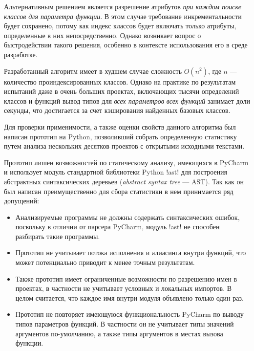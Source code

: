 Альтернативным решением является разрешение атрибутов \emph{при каждом поиске
 классов для параметра функции}. В этом случае требование инкрементальности
будет сохранено, потому как индекс классов будет включать только атрибуты,
определенные в них непосредственно. Однако возникает вопрос о быстродействии
такого решения, особенно в контексте использования его в среде разработке. 

Разработанный алгоритм имеет в худшем случае сложность $O(n^2)$, где $n$ ---
количество проиндексированных классов. Однако на практике по результатам испытаний даже в
очень больших проектах, включающих тысячи определений классов и функций вывод
типов для \emph{всех параметров всех функций} занимает доли секунды, что
достигается за счет кэширования найденных базовых классов.


Для проверки применимости, а также оценки свойств данного алгоритма был написан
прототип на Python, позволивший собрать определенную статистику путем анализа
нескольких десятков проектов с открытыми исходными текстами.

Прототип лишен возможностей по статическому анализу, имеющихся в PyCharm и
использует модуль стандартной библиотеки Python !ast! для построения абстрактных
синтаксических деревьев (\emph{abstract syntax tree} --- AST). Так как он был
написан преимущественно для сбора статистики в нем принимается ряд допущений:


\begin{itemize}
    \item{%
        Анализируемые программы не должны содержать синтаксических ошибок,
        поскольку в отличии от парсера PyCharm, модуль !ast! не способен
        разбирать такие программы.
      }
    \item{%
        Прототип не учитывает потока исполнения и алиасинга внутри функций, что
        может потенциально приводит к менее точным результатам.
      }
    \item{%
        Также прототип имеет ограниченные возможности по разрешению имен в проектах, в
        частности не учитывает условных и локальных импортов. В целом считается,
        что каждое имя внутри модуля объявлено только один раз.
      }
    \item{%
        Прототип не повторяет имеющуюся функциональность PyCharm по
        выводу типов параметров функций. В частности он не учитывает типы
        значений аргументов по-умолчанию, а также типы аргументов в местах
        вызова функции. 
      }
\end{itemize}


